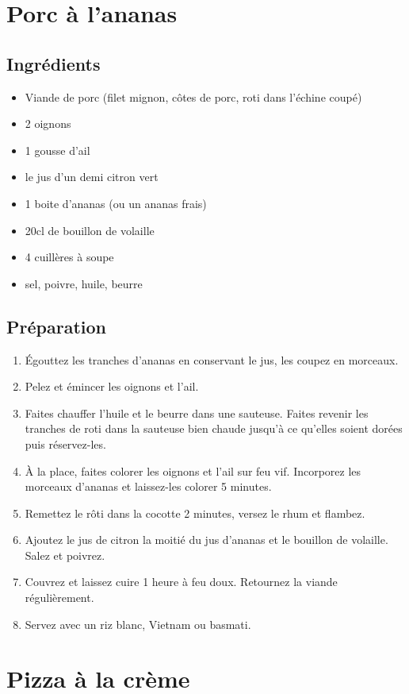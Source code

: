 \newpage
\section{Porc à l'ananas}
\subsection*{Ingrédients}
\begin{itemize}
\item Viande de porc (filet mignon, côtes de porc, roti dans l'échine coupé)
\item 2 oignons
\item 1 gousse d'ail
\item le jus d'un demi citron vert
\item 1 boite d'ananas (ou un ananas frais)
\item 20cl de bouillon de volaille
\item 4 cuillères à soupe
\item sel, poivre, huile, beurre
\end{itemize}

\subsection*{Préparation}
\begin{enumerate}
\item Égouttez les tranches d’ananas en conservant le jus, les coupez en morceaux.
\item Pelez et émincer les oignons et l’ail.
\item Faites chauffer l’huile et le beurre dans une sauteuse. Faites revenir les tranches de roti dans la sauteuse bien chaude jusqu'à ce qu'elles soient dorées puis réservez-les.
\item À la place, faites colorer les oignons et l’ail sur feu vif. Incorporez les morceaux d’ananas et laissez-les colorer 5 minutes.
\item Remettez le rôti dans la cocotte 2 minutes, versez le rhum et flambez.
\item Ajoutez le jus de citron la moitié du jus d'ananas et le bouillon de volaille. Salez et poivrez.
\item Couvrez et laissez cuire 1 heure à feu doux. Retournez la viande régulièrement.
\item Servez avec un riz blanc, Vietnam ou basmati.
\end{enumerate}

\newpage
\section{Pizza à la crème}
